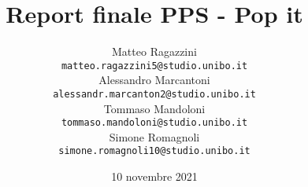 \title{Report finale PPS - Pop it}
\author{Matteo Ragazzini
\\\texttt{matteo.ragazzini5@studio.unibo.it}
\\Alessandro Marcantoni
\\\texttt{alessandr.marcanton2@studio.unibo.it}
\\Tommaso Mandoloni
\\\texttt{tommaso.mandoloni@studio.unibo.it}
\\Simone Romagnoli
\\\texttt{simone.romagnoli10@studio.unibo.it}
}
\date{10 novembre 2021}
